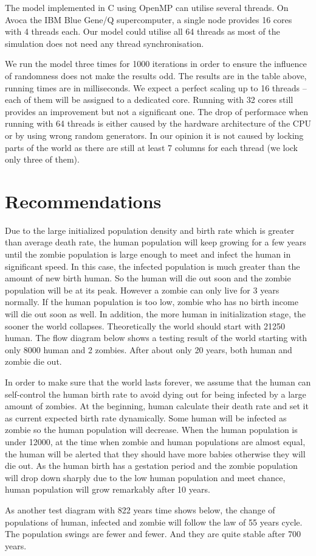 \documentclass[a4paper]{article}
\begin{document}
The model implemented in C using OpenMP can utilise several threads.
On Avoca the IBM Blue Gene/Q supercomputer, a single node provides 16 cores with 4 threads each.
Our model could utilise all 64 threads as most of the simulation does not need any thread synchronisation.

We run the model three times for 1000 iterations in order to ensure the influence of randomness does not make the results odd.
The results are in the table above, running times are in milliseconds.
We expect a perfect scaling up to 16 threads -- each of them will be assigned to a dedicated core.
Running with 32 cores still provides an improvement but not a significant one.
The drop of performace when running with 64 threads is either caused by the hardware architecture of the CPU or by using wrong random generators.
In our opinion it is not caused by locking parts of the world as there are still at least 7 columns for each thread (we lock only three of them).

\section{Recommendations}

Due to the large initialized population density and birth rate which is greater than average death rate, the human population will keep growing for a few years until the zombie population is large enough to meet and infect the human in significant speed.
In this case, the infected population is much greater than the amount of new birth human.
So the human will die out soon and the zombie population will be at its peak.
However a zombie can only live for 3 years normally.
If the human population is too low, zombie who has no birth income will die out soon as well.
In addition, the more human in initialization stage, the sooner the world collapses.
Theoretically the world should start with 21250 human.
The flow diagram below shows a testing result of the world starting with only 8000 human and 2 zombies.
After about only 20 years, both human and zombie die out.

In order to make sure that the world lasts forever, we assume that the human can self-control the human birth rate to avoid dying out for being infected by a large amount of zombies.
At the beginning, human calculate their death rate and set it as current expected birth rate dynamically.
Some human will be infected as zombie so the human population will decrease.
When the human population is under 12000, at the time when zombie and human populations are almost equal, the human will be alerted that they should have more babies otherwise they will die out.
As the human birth has a gestation period and the zombie population will drop down sharply due to the low human population and meet chance, human population will grow remarkably after 10 years. 

As another test diagram with 822 years time shows below, the change of populations of human, infected and zombie will follow the law of 55 years cycle.
The population swings are fewer and fewer.
And they are quite stable after 700 years.




\end{document}
